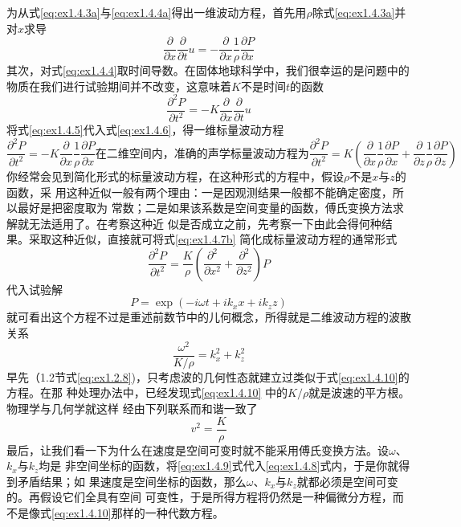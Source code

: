 为从式\ref{eq:ex1.4.3a}与\ref{eq:ex1.4.4a}得出一维波动方程，首先用$\rho$除式\ref{eq:ex1.4.3a}并对$x$求导
\begin{equation}
\frac{\partial }{\partial x}\frac{\partial}{\partial t}u=-\frac{\partial}{\partial x}
\frac{1}{\rho}\frac{\partial P}{\partial x}
\label{eq:ex1.4.5}
\end{equation}
其次，对式\ref{eq:ex1.4.4}取时间导数。在固体地球科学中，我们很幸运的是问题中的
物质在我们进行试验期间并不改变，这意味着$K$不是时间$t$的函数
\begin{equation}
\frac{\partial^2 P}{\partial t^2}=-K\frac{\partial }{\partial x}\frac{\partial}{\partial t}u
\label{eq:ex1.4.6}
\end{equation}
将式\ref{eq:ex1.4.5}代入式\ref{eq:ex1.4.6}，得一维标量波动方程
\begin{subequations}\label{eq:ex1.4.7}
\begin{equation}
\frac{\partial^2 P}{\partial t^2}=-K\frac{\partial }{\partial x}
\frac{1}{\rho}\frac{\partial P}{\partial x} \label{eq:ex1.4.7a}
\end{equation}
在二维空间内，准确的声学标量波动方程为
\begin{equation}
\frac{\partial^2 P}{\partial t^2}=K(\frac{\partial }{\partial x}
\frac{1}{\rho}\frac{\partial P}{\partial x}+\frac{\partial }{\partial z}
\frac{1}{\rho}\frac{\partial P}{\partial z} )\label{eq:ex1.4.7b}
\end{equation}
\end{subequations}
你经常会见到简化形式的标量波动方程，在这种形式的方程中，假设$\rho$不是$x$与$z$的函数，采
用这种近似一般有两个理由：一是因观测结果一般都不能确定密度，所以最好是把密度取为
常数；二是如果该系数是空间变量的函数，傅氏变换方法求解就无法适用了。在考察这种近
似是否成立之前，先考察一下由此会得何种结果。采取这种近似，直接就可将式\ref{eq:ex1.4.7b}
简化成标量波动方程的通常形式
\begin{equation}
\frac{\partial^2 P}{\partial t^2}=\frac{K}{\rho}(\frac{\partial^2}{\partial x^2}+
\frac{\partial^2}{\partial z^2})P
\label{eq:ex1.4.8}
\end{equation}
代入试验解
\begin{equation}
P=\exp (-i\omega t+ik_xx+ik_zz)
\label{eq:ex1.4.9}
\end{equation}
就可看出这个方程不过是重述前数节中的儿何概念，所得就是二维波动方程的波散关系
\begin{equation}
\frac{\omega^2}{K/\rho}=k_x^2+k_z^2
\label{eq:ex1.4.10}
\end{equation}
早先（1.2节式\ref{eq:ex1.2.8})，只考虑波的几何性态就建立过类似于式\ref{eq:ex1.4.10}的方程。在那
种处理办法中，已经发现式\ref{eq:ex1.4.10}
中的$K/\rho$就是波速的平方根。物理学与几何学就这样
经由下列联系而和谐一致了
\begin{equation}
v^2=\frac{K}{\rho}
\label{eq:ex1.4.11}
\end{equation}
最后，让我们看一下为什么在速度是空间可变时就不能采用傅氏变换方法。设$\omega$、$k_x$与$k_z$均是
非空间坐标的函数，将\ref{eq:ex1.4.9}式代入\ref{eq:ex1.4.8}式内，于是你就得到矛盾结果；如
果速度是空间坐标的函数，那么$\omega$、$k_x$与$k_z$就都必须是空间可变的。再假设它们全具有空间
可变性，于是所得方程将仍然是一种偏微分方程，而不是像式\ref{eq:ex1.4.10}那样的一种代数方程。

